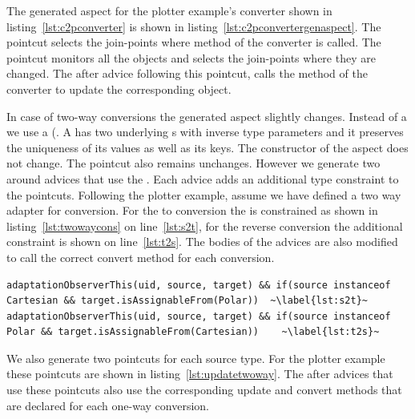 The generated aspect for the plotter example's converter shown in listing~\ref{lst:c2pconverter} is shown in listing~\ref{lst:c2pconvertergenaspect}. The  pointcut selects the join-points where  method of the  converter is called.  
The  pointcut monitors all the  objects and selects the join-points where they are changed. 
The after advice following this pointcut, calls the  method of the  converter to update the corresponding  object.

In case of two-way conversions the generated aspect slightly changes. 
Instead of a  we use a  (. 
A  has two underlying s with inverse type parameters and it preserves the uniqueness of its values as well as its keys. 
The constructor of the aspect does not change.
The  pointcut also remains unchanges. 
However we generate two around advices that use the .
Each advice adds an additional type constraint to the  pointcuts.
Following the plotter example, assume we have defined a two way adapter for  conversion. For the  to  conversion the  is constrained as shown in listing~\ref{lst:twowaycons} on line~\ref{lst:s2t}, for the reverse conversion the additional constraint is shown on line~\ref{lst:t2s}. 
The bodies of the  advices are also modified to call the correct convert method for each conversion. 

\begin{lstlisting}[float, caption={\lstinln{adaptationObserverThis} pointcut constraints for two-way conversion}, label={lst:twowaycons}]
adaptationObserverThis(uid, source, target) && if(source instanceof Cartesian && target.isAssignableFrom(Polar))  ~\label{lst:s2t}~
adaptationObserverThis(uid, source, target) && if(source instanceof Polar && target.isAssignableFrom(Cartesian))	~\label{lst:t2s}~
\end{lstlisting}

We also generate two  pointcuts for each source type. For the plotter example these pointcuts are shown in listing~\ref{lst:updatetwoway}. The after advices that use these pointcuts also use the corresponding update and convert methods that are declared for each one-way conversion. 

